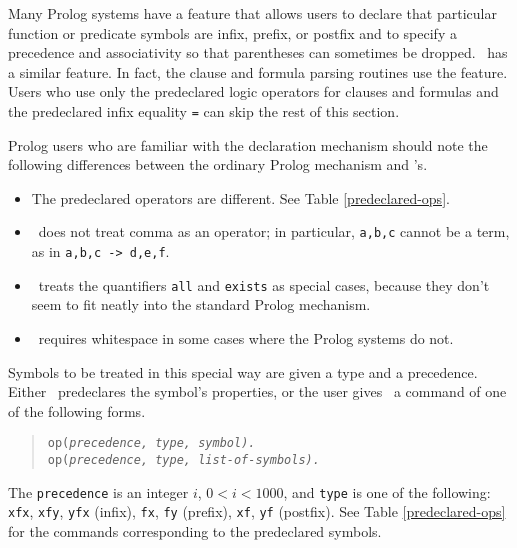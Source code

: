 \documentclass[11pt]{article}
\begin{document}
Many Prolog systems have a feature
that allows users to declare that particular function or predicate
symbols are infix, prefix, or postfix and to specify a precedence and
associativity so that parentheses can sometimes be dropped.
\otter\ has a similar feature.  In fact, the clause and formula
parsing routines use the feature.   Users who use only the
predeclared logic operators for clauses and formulas and the
predeclared infix equality \verb:=: can skip the rest of this section.

Prolog users who are familiar with the declaration mechanism should
note the following differences between the ordinary Prolog mechanism
and \otter's.
\begin{itemize}
\item
The predeclared operators are different.  See Table \ref{predeclared-ops}.
\item
\otter\ does not treat comma as an operator; in particular,
\verb:a,b,c: cannot be a term, as in \verb:a,b,c -> d,e,f:.
\item
\otter\ treats the quantifiers \verb:all: and \verb:exists: as
special cases, because they don't seem to fit neatly into the
standard Prolog mechanism.
\item
\otter\ requires whitespace in some cases where the Prolog systems do not.
\end{itemize}

Symbols to be treated in this special way are given a type and
a precedence.  Either \otter\ predeclares the symbol's properties,
or the user gives \otter\ a command of one of the following forms.
\begin{verse} \small
{\tt op(\em precedence\tt , \em type\tt , \em symbol\tt ).} \\
{\tt op(\em precedence\tt , \em type\tt , \em list-of-symbols\tt ).}
\end{verse}
The \verb:precedence: is an integer $i$, $0<i<1000$, and \verb:type:
is one of the following: \verb:xfx:, \verb:xfy:, \verb:yfx: (infix),
\verb:fx:, \verb:fy: (prefix), \verb:xf:, \verb:yf: (postfix).
See Table \ref{predeclared-ops} for the commands corresponding to the
predeclared symbols.
\end{document}
